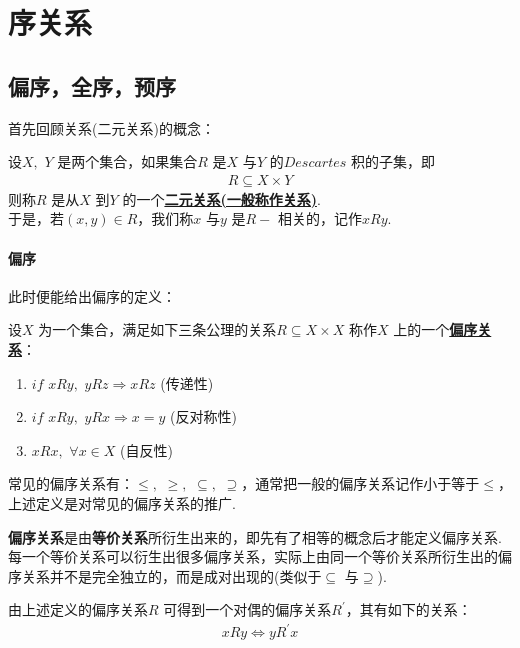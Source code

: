 \newpage

\section{序关系}
\subsection{偏序，全序，预序}
	首先回顾关系(二元关系)的概念：
	\begin{defn}\label{def 1.3.1}
		设$X , \,\, Y$ 是两个集合，如果集合$R$ 是$X$ 与$Y$ 的$Descartes$ 积的子集，即
		\begin{align}
			R \subseteq X \times Y
		\end{align}
		则称$R$ 是从$X$ 到$Y$ 的一个\underline{\textbf{二元关系(一般称作关系)}}.\\
		于是，若$(x , y) \in R$，我们称$x$ 与$y$ 是$R-$ 相关的，记作$xRy$.
	\end{defn}

\paragraph{偏序}
	此时便能给出偏序的定义：
	\begin{defn}
		设$X$ 为一个集合，满足如下三条公理的关系$R \subseteq X \times X$ 称作$X$ 上的一个\underline{\textbf{偏序关系}}：
		\begin{enumerate}
			\item $if \,\, xRy , \,\, yRz \Rightarrow xRz \,\,$(传递性)
			
			\item $if \,\, xRy , \,\, yRx \Rightarrow x = y \,\,$(反对称性)
			
			\item $xRx , \,\, \forall x \in X \,\,$(自反性)
		\end{enumerate}
	\end{defn}

	\begin{example}\label{ex 1.3.1}
		常见的偏序关系有：$\leq , \,\, \geq , \,\, \subseteq , \,\, \supseteq$，通常把一般的偏序关系记作小于等于$\leq$，上述定义是对常见的偏序关系的推广.
	\end{example}

	\begin{rmk}
		\textbf{偏序关系}是由\textbf{等价关系}所衍生出来的，即先有了相等的概念后才能定义偏序关系.每一个等价关系可以衍生出很多偏序关系，实际上由同一个等价关系所衍生出的偏序关系并不是完全独立的，而是成对出现的(类似于$\subseteq$ 与$\supseteq$).
		\begin{example}\label{ex 1.3.2}
			由上述定义的偏序关系$R$ 可得到一个对偶的偏序关系$R^{'}$，其有如下的关系：
			\begin{align}
				xRy \Leftrightarrow yR^{'}x
			\end{align}
		\end{example}
	\end{rmk}

